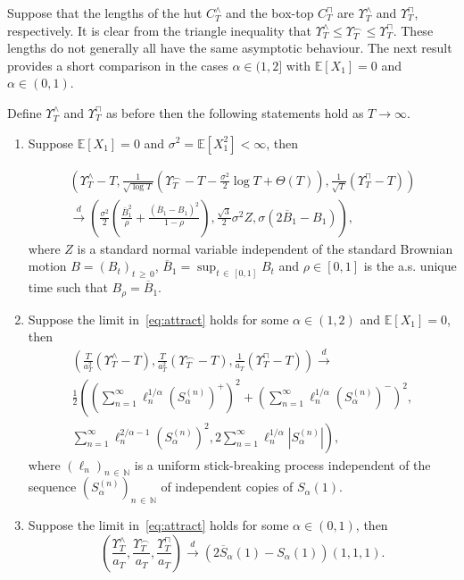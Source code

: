 \documentclass[AHL,Unicode,longabstracts,published]{cedram}
\newcommand\N{\mathbb{N}}
\newcommand\E{\mathds{E}}
\newcommand\1{\mathds{1}}
\newcommand\cid{\xrightarrow{d}}
\newcommand\ov[1]{\overline{#1}}
\newcommand*{\alphenumi}{\renewcommand*{\theenumi}{\alph{enumi}}}
\begin{document}
\label{page:Fig_2}
Suppose that the lengths of the hut $C^\wedge_T$ and the box-top $C^\sqcap_T$ are $\Upsilon^\wedge_T$ and $\Upsilon^\sqcap_T$, respectively. It is clear from the triangle inequality that $\Upsilon^\wedge_T\le\Upsilon_T^\frown\le\Upsilon^\sqcap_T$. These lengths do not generally all have the same asymptotic behaviour. The next result provides a short comparison in the cases $\alpha\in(1,2]$ with $\E[X_1]=0$ and $\alpha\in(0,1)$.

\begin{prop}\label{prop:compare_length}
Define $\Upsilon^\wedge_T$ and $\Upsilon^\sqcap_T$ as before then the following statements hold as $T\to\infty$.
\begin{enumerate}\alphenumi
\item\label{prop1.8.a} Suppose $\E[X_1]=0$ and $\sigma^2=\E[X_1^2]<\infty$, then

\begin{multline*}
\left(\Upsilon^\wedge_T-T,
\frac{1}{\sqrt{\log T}}
\left(\Upsilon_T^{\frown} -T-\frac{\sigma^2}{2}\log T +\Theta(T)\right),\frac{1}{\sqrt{T}}\left(\Upsilon^\sqcap_T-T\right)\right)\\
\cid
\left(
\frac{\sigma^2}{2}\left(\frac{\ov B_1^2}{\rho} +\frac{\left(\ov B_1-B_1\right)^2}{1-\rho}\right),
\frac{\sqrt{3}}{2}\sigma^2Z,\sigma\left(2\ov B_1-B_1\right)\right),
\end{multline*}
where $Z$ is a standard normal variable independent of the standard Brownian motion $B=(B_t)_{t\,\ge\,0}$, $\ov B_1=\sup_{t\,\in\,[0,1]}B_t$ and $\rho\in[0,1]$ is the a.s. unique time such that $B_\rho=\ov B_1$.
\item\label{prop1.8.b} Suppose the limit in~\eqref{eq:attract} holds for some $\alpha\in(1,2)$ and $\E[X_1]=0$, then
\begin{multline*}
\left(\frac{T}{a_T^2}\left(\Upsilon^\wedge_T-T\right),
\frac{T}{a_T^2}\left(\Upsilon^\frown_T-T\right),\frac{1}{a_T}\left(\Upsilon^\sqcap_T-T\right)\right)
\cid\\
\frac{1}{2}\left(
\left(\sum_{n=1}^\infty
\ell_n^{1/\alpha}\left(S_\alpha^{(n)}\right)^+\right)^2 +\left(\sum_{n=1}^\infty
\ell_n^{1/\alpha}\left(S_\alpha^{(n)}\right)^-\right)^2,\right.\\
\left.\sum_{n=1}^\infty
\ell_n^{2/\alpha-1}\left(S_\alpha^{(n)}\right)^2,2\sum_{n=1}^\infty
\ell_n^{1/\alpha}\left|S_\alpha^{(n)}\right|\right),
\end{multline*}
where $(\ell_n)_{n\,\in\,\N}$ is a uniform stick-breaking process independent of the sequence $(S_\alpha^{(n)})_{n\,\in\,\N}$ of independent copies of $S_\alpha(1)$.
\item\label{prop1.8.c} Suppose the limit in~\eqref{eq:attract} holds for some $\alpha\in(0,1)$, then
\[
\left(\frac{\Upsilon^\wedge_T}{a_T},
\frac{\Upsilon^\frown_T}{a_T},
\frac{\Upsilon^\sqcap_T}{a_T}\right)
\cid \left(2\ov{S}_\alpha(1)-S_\alpha(1)\right)(1,1,1).
\]
\end{enumerate}
\end{prop}
\end{document}
